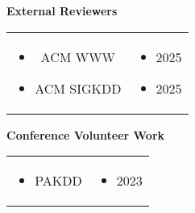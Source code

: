 \vspace{1.0em}
{\fontsize{11pt}{0}\textbf{External Reviewers}}

\begin{tabular}{cc}
  \begin{minipage}[h]{0.17\textwidth}
    {\setlength{\leftmargini}{17.2pt}
    \begin{itemize}
      \vspace{0.9em}
      \item ACM WWW
      \item ACM SIGKDD
    \end{itemize}}
  \end{minipage} &
  \begin{minipage}[h]{0.83\textwidth}
    {\setlength{\leftmargini}{-5pt}
    \begin{itemize}
      \vspace{0.9em}
      \item[] 2025
      \item[] 2025
    \end{itemize}}
  \end{minipage}
\end{tabular}

\vspace{1.0em}
{\fontsize{11pt}{0}\textbf{Conference Volunteer Work}}

\begin{tabular}{cc}
  \begin{minipage}[h]{0.17\textwidth}
    {\setlength{\leftmargini}{17.2pt}
    \begin{itemize}
      \vspace{0.5em}
      \item PAKDD
    \end{itemize}}
  \end{minipage} &
  \begin{minipage}[h]{0.83\textwidth}
    {\setlength{\leftmargini}{-5pt}
    \begin{itemize}
      \vspace{0.5em}
      \item[] 2023
    \end{itemize}}
  \end{minipage}
\end{tabular}
